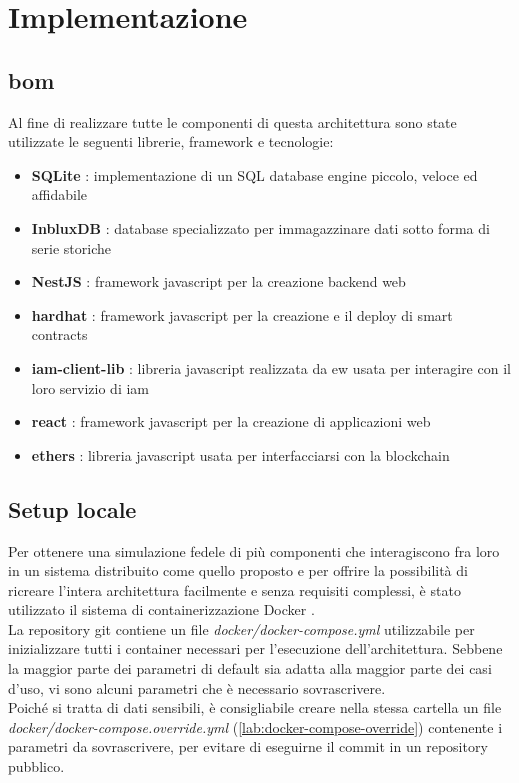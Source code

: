 
\section{Implementazione}

\subsection{\gls{bom}}
Al fine di realizzare tutte le componenti di questa architettura sono state utilizzate le seguenti librerie, framework e tecnologie:

\begin{itemize}
    \item \textbf{SQLite} \cite{sftw:sqlite}: implementazione di un SQL database engine piccolo, veloce ed affidabile
    \item \textbf{InbluxDB} \cite{sftw:influxdb}: database specializzato per immagazzinare dati sotto forma di serie storiche
    \item \textbf{NestJS} \cite{sftw:nestjs}: framework javascript per la creazione backend web
    \item \textbf{hardhat} \cite{sftw:hardhat}: framework javascript per la creazione e il deploy di smart contracts
    \item \textbf{iam-client-lib} \cite{sftw:iam-client-lib}: libreria javascript realizzata da \gls{ew} usata per interagire con il loro servizio di \gls{iam}
    \item \textbf{react} \cite{sftw:react}: framework javascript per la creazione di applicazioni web
    \item \textbf{ethers} \cite{sftw:ethers}: libreria javascript usata per interfacciarsi con la blockchain
\end{itemize}

\subsection{Setup locale}
Per ottenere una simulazione fedele di più componenti che interagiscono fra loro in un sistema distribuito come quello proposto e
per offrire la possibilità di ricreare l'intera architettura facilmente e senza requisiti complessi, è stato utilizzato il sistema di containerizzazione Docker \cite{sftw:docker}. \\
La repository git contiene un file \textit{docker/docker-compose.yml} utilizzabile per inizializzare tutti i container necessari per l'esecuzione dell'architettura.
Sebbene la maggior parte dei parametri di default sia adatta alla maggior parte dei casi d'uso, vi sono alcuni parametri che è necessario sovrascrivere. \\
Poiché si tratta di dati sensibili, è consigliabile creare nella stessa cartella un file \textit{docker/docker-compose.override.yml} (\autoref{lab:docker-compose-override}) contenente i parametri da sovrascrivere,
per evitare di eseguirne il commit in un repository pubblico.

